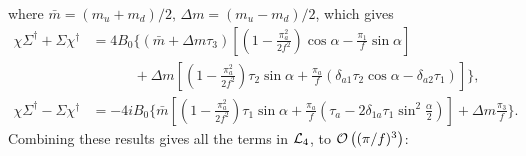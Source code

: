where $\bar m  = (m_u + m_d)/2, \, \Delta m = (m_u - m_d)/2$, which gives 
\begin{align*}
    \chi \Sigma^\dagger + \Sigma \chi^\dagger
    & = 4 B_0 \Bigg\{
         (\bar m + \Delta m \tau_3)
        \left[
            \left(
                1 
                - \frac{\pi_a^2}{2f^2}
            \right)
            \cos{\alpha}
            - \frac{\pi_1}{f}    
            \sin{\alpha}
        \right]\\
    & \quad \quad \quad
    + \Delta m 
    \left[
        \left(
            1 
            - \frac{\pi_a^2}{2f^2}
        \right)
        \tau_2 \sin{\alpha}
        +  \frac{\pi_a}{f}
        \left(
            \delta_{a1} \tau_2 \cos{\alpha} - \delta_{a2} \tau_1
        \right)
    \right]
    \Bigg\}, \\
    \chi \Sigma^\dagger  - \Sigma \chi^\dagger
    & = - 4 i B_0 \Bigg\{
        \bar m 
        \left[
            \left(
                1 - \frac{\pi_a^2}{2f^2}
            \right)
            \tau_1 \sin{\alpha}
            +  \frac{\pi_a}{f}    \left(
                \tau_a 
                - 2 \delta_{1a} \tau_1 \sin^2{\frac{\alpha}{2}}
            \right)        
        \right]
        + \Delta m 
            \frac{\pi_3}{f}
    \Bigg\}.
\end{align*}
Combining these results gives all the terms in $\Ell_4$, to $\Oh[3]{(\pi/f)}$:
\begingroup
\allowdisplaybreaks %
